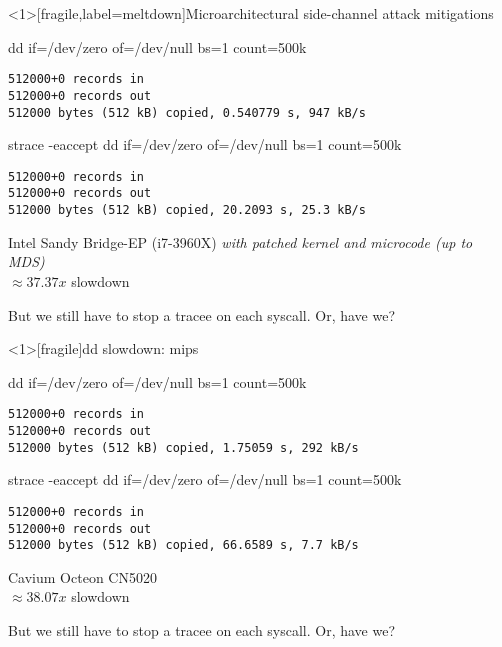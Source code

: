 \documentclass[unicode]{beamer}
\begin{document}
\begin{frame}<1>[fragile,label=meltdown]{Microarchitectural side-channel attack mitigations}
\begin{block}{\large dd if=/dev/zero of=/dev/null bs=1 count=500k}
\begin{verbatim}
512000+0 records in
512000+0 records out
512000 bytes (512 kB) copied, 0.540779 s, 947 kB/s
\end{verbatim}
\end{block}
\begin{block}{\large strace -eaccept dd if=/dev/zero of=/dev/null bs=1 count=500k}
\begin{verbatim}
512000+0 records in
512000+0 records out
512000 bytes (512 kB) copied, 20.2093 s, 25.3 kB/s
\end{verbatim}
\end{block}
\begin{scriptsize}
Intel Sandy Bridge-EP (i7-3960X) \emph{with patched kernel and microcode (up to MDS)} \\
$\approx 37.37x$ slowdown \\
\end{scriptsize}
\pause
But we still have to stop a tracee on each syscall. Or, have we?
\end{frame}

\begin{frame}<1>[fragile]{dd slowdown: mips}
\begin{block}{\large dd if=/dev/zero of=/dev/null bs=1 count=500k}
\begin{verbatim}
512000+0 records in
512000+0 records out
512000 bytes (512 kB) copied, 1.75059 s, 292 kB/s
\end{verbatim}
\end{block}
\begin{block}{\large strace -eaccept dd if=/dev/zero of=/dev/null bs=1 count=500k}
\begin{verbatim}
512000+0 records in
512000+0 records out
512000 bytes (512 kB) copied, 66.6589 s, 7.7 kB/s
\end{verbatim}
\end{block}
\begin{scriptsize}
Cavium Octeon CN5020 \\
$\approx 38.07x$ slowdown \\
\end{scriptsize}
\pause
But we still have to stop a tracee on each syscall. Or, have we?
\end{frame}
\end{document}
